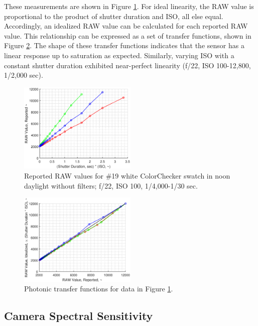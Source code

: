 \documentclass[twocolumn,10pt]{asme2ej}
\newcommand{\id}{\hspace{6 mm}}
\begin{document}
\id These measurements are shown in Figure \ref{linearity_shutter_data}. For ideal linearity, the RAW value is proportional to the product of shutter duration and ISO, all else equal. Accordingly, an idealized RAW value can be calculated for each reported RAW value. This relationship can be expressed as a set of transfer functions, shown in Figure \ref{linearity_shutter_curves}. The shape of these transfer functions indicates that the sensor has a linear response up to saturation as expected. Similarly, varying ISO with a constant shutter duration exhibited near-perfect linearity (f/22, ISO 100-12,800, 1/2,000 sec).

\begin{figure}
\centering
\includegraphics[width=0.5\textwidth]{linearity_shutter_data.eps}
\caption{Reported RAW values for \#19 white ColorChecker swatch in noon daylight without filters; f/22, ISO 100, 1/4,000-1/30 sec.}
\label{linearity_shutter_data}
\end{figure}

\begin{figure}
\centering
\includegraphics[width=0.5\textwidth]{linearity_shutter_curves.eps}
\caption{Photonic transfer functions for data in Figure \ref{linearity_shutter_data}.}
\label{linearity_shutter_curves}
\end{figure}

\subsection{Camera Spectral Sensitivity}
\label{Camera_Spectral_Sensitivity}
\end{document}
